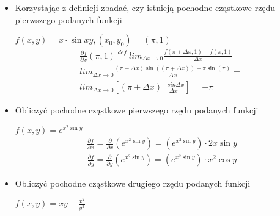 \documentclass[main.tex]{subfiles}
\begin{document}
    \begin{itemize}
        \item  Korzystając z definicji zbadać, czy istnieją pochodne cząstkowe rzędu pierwszego podanych funkcji

        $f(x,y) = x \cdot \sin{xy}, (x_0, y_0) = (\pi,1)$\newline
        \newline
        \begin{equation}
            \begin{aligned}
                \frac{\partial f}{\partial x}(\pi, 1)  \stackrel{def}{=} lim_{\Delta x \rightarrow 0} \frac{f(\pi + \Delta x, 1) - f(\pi, 1)}{\Delta x} = \\
                lim_{\Delta x \rightarrow 0} \frac{(\pi + \Delta x ) \sin{((\pi + \Delta x))} - \pi \sin{(\pi)}}{\Delta x} = \\
                lim_{\Delta x \rightarrow 0} \left[ (\pi + \Delta x) \frac{-sin \Delta x}{\Delta x} \right] = - \pi
            \end{aligned}
        \end{equation}

        \item Obliczyć pochodne cząstkowe pierwszego rzędu podanych funkcji

        $f(x,y) = e^{x^2 \sin y}$\newline
        \newline
        \begin{equation}
            \begin{aligned}
                \frac{\partial f}{\partial x} = \frac{\partial}{\partial x} \left( e^{x^2 \sin y} \right ) = \left( e^{x^2 \sin y} \right) \cdot 2x \sin y
            \end{aligned}
        \end{equation}
        \begin{equation}
            \begin{aligned}
                \frac{\partial f}{\partial y} = \frac{\partial}{\partial y} \left( e^{x^2 \sin y} \right ) = \left( e^{x^2 \sin y} \right) \cdot x^2 \cos y
            \end{aligned}
        \end{equation}

        \item Obliczyć pochodne cząstkowe drugiego rzędu podanych funkcji

        $f(x,y) = xy + \frac{x^2}{y^3}$


\end{itemize}
\end{document}
